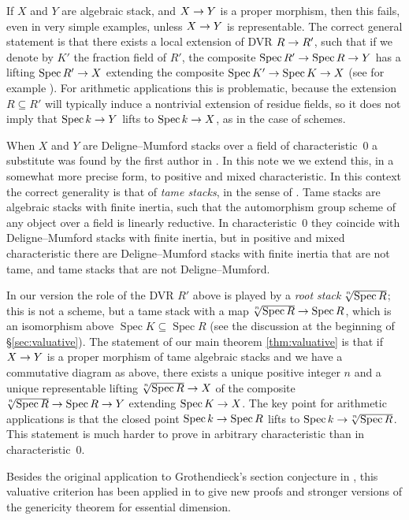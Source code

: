 \documentclass{amsart}
\numberwithin{equation}{section}
\numberwithin{subsection}{section}
\theoremstyle{definition}
\theoremstyle{remark}
\newcommand\arr{\ifinner\to\else\longrightarrow\fi}
\newcommand\spec{\operatorname{Spec}}
\newcommand\radice[2][\relax]{\hspace{-1.5pt}\sqrt[\uproot{2}#1]{#2}}
\begin{document}
If $X$ and $Y$ are algebraic stack, and $X \arr Y$ is a proper morphism, then this fails, even in very simple examples, unless $X \arr Y$ is representable. The correct general statement is that there exists a local extension of DVR $R \arr R'$, such that if we denote by $K'$ the fraction field of $R'$, the composite $\spec R' \arr \spec R \arr Y$ has a lifting $\spec R' \arr X$ extending the composite $\spec K' \arr \spec K \arr X$ (see for example  \cite[\href{https://stacks.math.columbia.edu/tag/0CLY}{Tag 0CLY}]{stacks-project}). For arithmetic applications this is problematic, because the extension $R \subseteq R'$ will typically induce a nontrivial extension of residue fields, so it does not imply that $\spec k \arr Y$ lifts to $\spec k \arr X$, as in the case of schemes.

When $X$ and $Y$ are Deligne--Mumford stacks over a field of characteristic~$0$ a substitute was found by the first author in \cite[Theorem~1]{giulio-section-birational}. In this note we we extend this, in a somewhat more precise form, to positive and mixed characteristic. In this context the correct generality is that of \emph{tame stacks}, in the sense of \cite{dan-olsson-vistoli1}. Tame stacks are algebraic stacks with finite inertia, such that the automorphism group scheme of any object over a field is linearly reductive. In characteristic~$0$ they coincide with Deligne--Mumford stacks with finite inertia, but in positive and mixed characteristic there are Deligne--Mumford stacks with finite inertia that are not tame, and tame stacks that are not Deligne--Mumford.

In our version the role of the DVR $R'$ above is played by a \emph{root stack} $\radice[n]{\spec R}$; this is not a scheme, but a tame stack with a map $\radice[n]{\spec R} \arr \spec R$, which is an isomorphism above $\spec K \subseteq \spec R$ (see the discussion at the beginning of \S\ref{sec:valuative}). The statement of our main theorem \ref{thm:valuative} is that if $X \arr Y$ is a proper morphism of tame algebraic stacks and we have a commutative diagram as above, there exists a unique positive integer $n$ and a unique representable lifting $\radice[n]{\spec R} \arr X$ of the composite $\radice[n]{\spec R} \arr \spec R \arr Y$ extending $\spec K \arr X$. The key point for arithmetic applications is that the closed point $\spec k \arr \spec R$ lifts to $\spec k \arr \radice[n]{\spec R}$. This statement is much harder to prove in arbitrary characteristic than in characteristic~$0$.

Besides the original application to Grothendieck's section conjecture in \cite{giulio-section-birational}, this valuative criterion has been applied in \cite{giulio-angelo-genericity} to give new proofs and stronger versions of the genericity theorem for essential dimension. 
\end{document}
